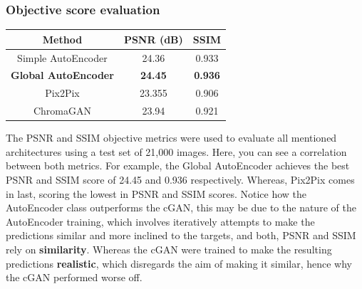 \subsubsection*{Objective score evaluation}
\begin{center}
\begin{tabular}{||c c c||} 
 \hline
  Method & PSNR (dB) & SSIM\\
 \hline
 Simple AutoEncoder & 24.36 & 0.933\\ 
 \hline
 \textbf{Global AutoEncoder} & \textbf{24.45} & \textbf{0.936}\\
 \hline
 Pix2Pix & 23.355 & 0.906\\
 \hline
 ChromaGAN & 23.94 & 0.921\\
 \hline
\end{tabular}
\end{center}
The PSNR and SSIM objective metrics were used to evaluate all mentioned architectures using a test set of 21,000 images.  Here, you can see a correlation between both metrics. For example, the Global AutoEncoder achieves the best PSNR and SSIM score of 24.45 and 0.936 respectively. Whereas, Pix2Pix comes in last, scoring the lowest in PSNR and SSIM scores. Notice how the AutoEncoder class outperforms the cGAN, this may be due to the nature of the AutoEncoder training, which involves iteratively attempts to make the predictions similar and more inclined to the targets, and both, PSNR and SSIM rely on \textbf{similarity}. Whereas the cGAN were trained to make the resulting predictions \textbf{realistic}, which disregards the aim of making it similar, hence why the cGAN performed worse off.




